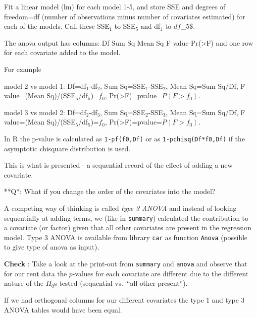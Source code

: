 \documentclass[
  ignorenonframetext,
]{beamer}
\begin{document}
\begin{frame}[fragile]
Fit a linear model (lm) for each model 1-5, and store SSE and degrees of
freedom=df (number of observations minus number of covariates estimated)
for each of the models. Call these SSE\(_1\) to SSE\(_5\) and df\(_1\)
to \(df\)\_5\$.

The anova output has columns: Df Sum Sq Mean Sq F value
Pr(\textgreater F) and one row for each covariate added to the model.

For example

model 2 vs model 1: Df=df\(_1\)-df\(_2\), Sum Sq=SSE\(_1\)-SSE\(_2\),
Mean Sq=Sum Sq/Df, F value=(Mean Sq)/(SSE\(_5\)/df\(_5\))=\(f_0\),
Pr(\textgreater F)=pvalue=\(P(F>f_0)\).

model 3 vs model 2: Df=df\(_2\)-df\(_3\), Sum Sq=SSE\(_2\)-SSE\(_3\),
Mean Sq=Sum Sq/Df, F value=(Mean Sq)/(SSE\(_5\)/df\(_5\))=\(f_0\),
Pr(\textgreater F)=pvalue=\(P(F>f_0)\).

In R the p-value is calculated as \texttt{1-pf(f0,Df)} or as
\texttt{1-pchisq(Df*f0,Df)} if the asymptotic chisquare distribution is
used.

This is what is presented - a sequential record of the effect of adding
a new covariate.
\end{frame}

\begin{frame}
**Q*: What if you change the order of the covariates into the model?
\end{frame}

\begin{frame}[fragile]
A competing way of thinking is called \emph{type 3 ANOVA} and instead of
looking sequentially at adding terms, we (like in \texttt{summary})
calculated the contribution to a covariate (or factor) given that all
other covariates are present in the regression model. Type 3 ANOVA is
available from library \texttt{car} as function \texttt{Anova} (possible
to give type of anova as input).

\textbf{Check} : Take a look at the print-out from \texttt{summary} and
\texttt{anova} and observe that for our rent data the \(p\)-values for
each covariate are different due to the different nature of the \(H_0\)s
tested (sequential vs.~``all other present'').

If we had orthogonal columns for our different covariates the type 1 and
type 3 ANOVA tables would have been equal.
\end{frame}
\end{document}
